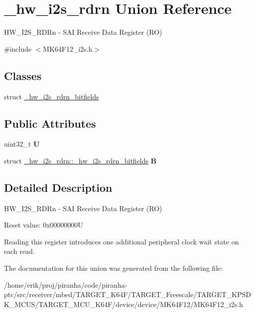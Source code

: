 \hypertarget{union__hw__i2s__rdrn}{}\section{\+\_\+hw\+\_\+i2s\+\_\+rdrn Union Reference}
\label{union__hw__i2s__rdrn}


H\+W\+\_\+\+I2\+S\+\_\+\+R\+D\+Rn -\/ S\+AI Receive Data Register (RO)  




{\ttfamily \#include $<$M\+K64\+F12\+\_\+i2s.\+h$>$}

\subsection*{Classes}
\begin{DoxyCompactItemize}
\item 
struct \hyperlink{struct__hw__i2s__rdrn_1_1__hw__i2s__rdrn__bitfields}{\+\_\+hw\+\_\+i2s\+\_\+rdrn\+\_\+bitfields}
\end{DoxyCompactItemize}
\subsection*{Public Attributes}
\begin{DoxyCompactItemize}
\item 
uint32\+\_\+t {\bfseries U}\hypertarget{union__hw__i2s__rdrn_a0f3832f10f1484aaf1aad8f7a18a4ad6}{}\label{union__hw__i2s__rdrn_a0f3832f10f1484aaf1aad8f7a18a4ad6}

\item 
struct \hyperlink{struct__hw__i2s__rdrn_1_1__hw__i2s__rdrn__bitfields}{\+\_\+hw\+\_\+i2s\+\_\+rdrn\+::\+\_\+hw\+\_\+i2s\+\_\+rdrn\+\_\+bitfields} {\bfseries B}\hypertarget{union__hw__i2s__rdrn_a6fe6a80c22fc536dd818f9d22ae69d7d}{}\label{union__hw__i2s__rdrn_a6fe6a80c22fc536dd818f9d22ae69d7d}

\end{DoxyCompactItemize}


\subsection{Detailed Description}
H\+W\+\_\+\+I2\+S\+\_\+\+R\+D\+Rn -\/ S\+AI Receive Data Register (RO) 

Reset value\+: 0x00000000U

Reading this register introduces one additional peripheral clock wait state on each read. 

The documentation for this union was generated from the following file\+:\begin{DoxyCompactItemize}
\item 
/home/erik/proj/piranha/code/piranha-\/ptc/src/receiver/mbed/\+T\+A\+R\+G\+E\+T\+\_\+\+K64\+F/\+T\+A\+R\+G\+E\+T\+\_\+\+Freescale/\+T\+A\+R\+G\+E\+T\+\_\+\+K\+P\+S\+D\+K\+\_\+\+M\+C\+U\+S/\+T\+A\+R\+G\+E\+T\+\_\+\+M\+C\+U\+\_\+\+K64\+F/device/device/\+M\+K64\+F12/M\+K64\+F12\+\_\+i2s.\+h\end{DoxyCompactItemize}
